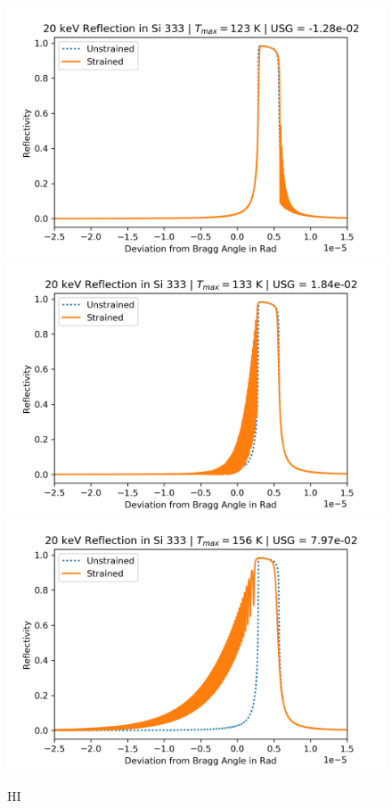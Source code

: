 \documentclass[preprint]{iucr}              %
\begin{document}
\begin{figure}
\caption{HI}
\includegraphics{images/333_20keV_4.png}
\includegraphics{images/333_20keV_5.png}
\includegraphics{images/333_20keV_7.png}

\end{figure}
\end{document}
